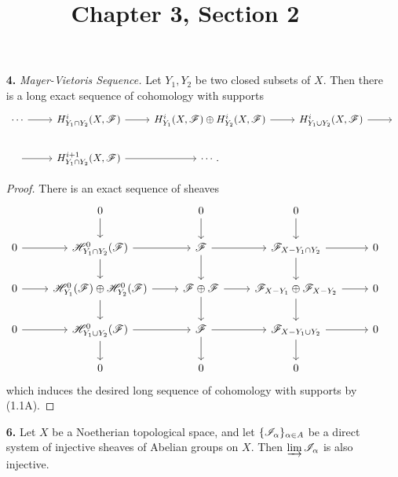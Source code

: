 \documentclass{article}
\title{Chapter 3, Section 2}
\begin{document}
\maketitle
\begin{enumerate} [label=\textbf{\arabic*.}, leftmargin=0em]
\item[\textbf{4.}] \textit{Mayer-Vietoris Sequence.} Let $Y_1, Y_2$ be two closed subsets of $X$. Then there is a long exact sequence of cohomology with supports
\[ \begin{tikzcd}
    \cdots \arrow[r] & {H^i_{Y_1 \cap Y_2}(X, \fF)} \arrow[r]       & {H_{Y_1}^i(X, \fF) \oplus H_{Y_2}^i(X, \fF)} \arrow[r] & {H^i_{Y_1 \cup Y_2}(X, \fF)} \arrow[r] & {} \\
    {} \arrow[r]     & {H^{i + 1}_{Y_1 \cap Y_2}(X, \fF)} \arrow[r] & \cdots .                                               &                                        &   
\end{tikzcd} \] 

\begin{proof}
    There is an exact sequence of sheaves
    \[ \begin{tikzcd}
        & 0 \arrow[d]                                                  & 0 \arrow[d]                        & 0 \arrow[d]                                            &   \\
0 \arrow[r] & \fH^0_{Y_1 \cap Y_2}(\fF) \arrow[r] \arrow[d]                & \fF \arrow[r] \arrow[d]            & \fF_{X - Y_1 \cap Y_2} \arrow[r] \arrow[d]             & 0 \\
0 \arrow[r] & \fH_{Y_1}^0(\fF) \oplus \fH_{Y_2}^0(\fF) \arrow[d] \arrow[r] & \fF \oplus \fF \arrow[d] \arrow[r] & \fF_{X - Y_1} \oplus \fF_{X - Y_2} \arrow[d] \arrow[r] & 0 \\
0 \arrow[r] & \fH^0_{Y_1 \cup Y_2}(\fF) \arrow[d] \arrow[r]                & \fF \arrow[d] \arrow[r]            & \fF_{X - Y_1 \cup Y_2} \arrow[d] \arrow[r]             & 0 \\
        & 0                                                            & 0                                  & 0                                                      &  
\end{tikzcd} \]
which induces the desired long sequence of cohomology with supports by (1.1A).
\end{proof}

\item[\textbf{6.}] Let $X$ be a Noetherian topological space, and let $\{ \mathscr{I}_\alpha \}_{\alpha \in A}$ be a direct system of injective sheaves of Abelian groups on $X$. Then $\varinjlim \mathscr{I} _\alpha$ is also injective.


\end{enumerate}
\end{document}
